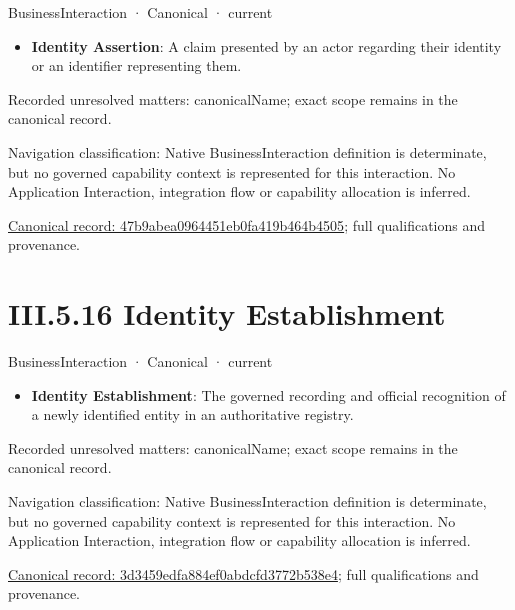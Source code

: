\label{element:47b9abea0964451eb0fa419b464b4505}
{\small BusinessInteraction · Canonical · current}\par

\begin{itemize}


\item \textbf{Identity Assertion}: A claim presented by an actor regarding their identity or an identifier representing them.

\end{itemize}

{\small Recorded unresolved matters: canonicalName; exact scope remains in the canonical record.}\par
{\small Navigation classification: Native BusinessInteraction definition is determinate, but no governed capability context is represented for this interaction. No Application Interaction, integration flow or capability allocation is inferred.}\par
{\footnotesize \href{../../../../../../../../continuum/business/business-interaction/47b9abea0964451eb0fa419b464b4505.md}{Canonical record: 47b9abea0964451eb0fa419b464b4505}; full qualifications and provenance.}\par
\section*{III.5.16 Identity Establishment}
\label{navigation:III.5.16}

\label{element:3d3459edfa884ef0abdcfd3772b538e4}
{\small BusinessInteraction · Canonical · current}\par

\begin{itemize}


\item \textbf{Identity Establishment}: The governed recording and official recognition of a newly identified entity in an authoritative registry.

\end{itemize}

{\small Recorded unresolved matters: canonicalName; exact scope remains in the canonical record.}\par
{\small Navigation classification: Native BusinessInteraction definition is determinate, but no governed capability context is represented for this interaction. No Application Interaction, integration flow or capability allocation is inferred.}\par
{\footnotesize \href{../../../../../../../../continuum/business/business-interaction/3d3459edfa884ef0abdcfd3772b538e4.md}{Canonical record: 3d3459edfa884ef0abdcfd3772b538e4}; full qualifications and provenance.}\par
